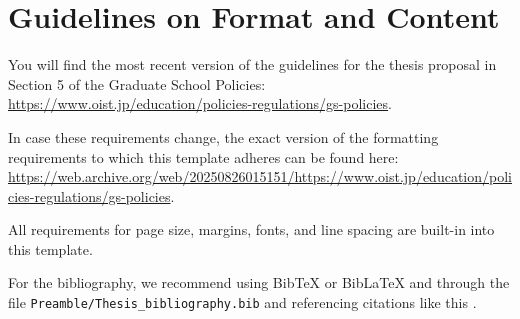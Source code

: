 
\chapter{Guidelines on Format and Content} \label{ch-1}

You will find the most recent version of the guidelines for the thesis proposal in Section 5 of the Graduate School Policies: \url{https://www.oist.jp/education/policies-regulations/gs-policies}.

In case these requirements change, the exact version of the formatting requirements to which this template adheres can be found here: \url{https://web.archive.org/web/20250826015151/https://www.oist.jp/education/policies-regulations/gs-policies}.

All requirements for page size, margins, fonts, and line spacing are built-in into this template.

For the bibliography, we recommend using BibTeX or BibLaTeX and through the file \texttt{Preamble/Thesis\_bibliography.bib} and referencing citations like this \cite{Lee98, Muc10, Kra27}. 
